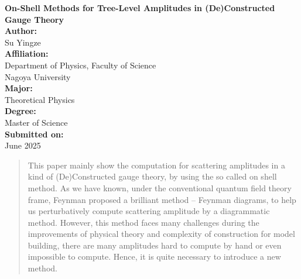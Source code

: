 \documentclass[12pt]{article}
\numberwithin{equation}{section}
\begin{document}
\begin{titlepage}
    \centering
    \vspace*{2cm}

    {\LARGE \textbf{On-Shell Methods for Tree-Level Amplitudes in (De)Constructed Gauge Theory}}\\[1.5cm]

    \textbf{Author:} \\
    {\Large Su Yingze} \\[1cm]

    \textbf{Affiliation:} \\
    Department of Physics, Faculty of Science \\
    Nagoya University \\[1cm]

    \textbf{Major:} \\
    Theoretical Physics \\[1cm]

    \textbf{Degree:} \\
    Master of Science \\[1cm]

    \textbf{Submitted on:} \\
    June 2025 \\[2cm]

    \vfill
\end{titlepage}
\newpage
\begin{abstract}
\normalsize
This paper mainly show the computation for scattering amplitudes in a kind of (De)Constructed gauge theory, by using the so called on shell method. As we have known,
under the conventional quantum field theory frame, Feynman proposed a brilliant method -- Feynman diagrams, to help us perturbatively compute scattering amplitude by a
diagrammatic method. However, this method faces many challenges during the improvements of physical theory and complexity of construction for model building, there are many
amplitudes hard to compute by hand or even impossible to compute. Hence, it is quite necessary to introduce a new method.      
\end{abstract}
\newpage
\tableofcontents
\newpage
\end{document}
